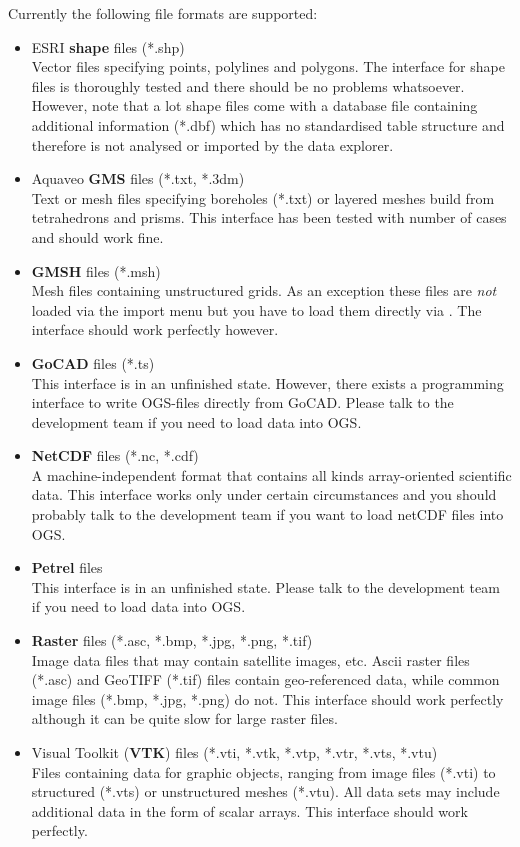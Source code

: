 Currently the following file formats are supported:
\begin{itemize}
\item ESRI \textbf{shape} files (*.shp)\\
Vector files specifying points, polylines and polygons. The interface for shape files is thoroughly tested and there should be no problems whatsoever. However, note that a lot shape files come with a database file containing additional information (*.dbf) which has no standardised table structure and therefore is not analysed or imported by the data explorer.
\item Aquaveo \textbf{GMS} files (*.txt, *.3dm)\\
Text or mesh files specifying boreholes (*.txt) or layered meshes build from tetrahedrons and prisms. This interface has been tested with number of cases and should work fine.
\item \textbf{GMSH} files (*.msh)\\
Mesh files containing unstructured grids. As an exception these files are \emph{not} loaded via the import menu but you have to load them directly via . The interface should work perfectly however.
\item \textbf{GoCAD} files (*.ts)\\
This interface is in an unfinished state. However, there exists a programming interface to write OGS-files directly from GoCAD. Please talk to the development team if you need to load data into OGS.
\item \textbf{NetCDF} files (*.nc, *.cdf)\\
A machine-independent format that contains all kinds array-oriented scientific data. This interface works only under certain circumstances and you should probably talk to the development team if you want to load netCDF files into OGS.
\item \textbf{Petrel} files\\
This interface is in an unfinished state. Please talk to the development team if you need to load data into OGS.
\item \textbf{Raster} files (*.asc, *.bmp, *.jpg, *.png, *.tif)\\
Image data files that may contain satellite images, etc. Ascii raster files (*.asc) and GeoTIFF (*.tif) files contain geo-referenced data, while common image files (*.bmp, *.jpg, *.png) do not. This interface should work perfectly although it can be quite slow for large raster files.
\item Visual Toolkit (\textbf{VTK}) files (*.vti, *.vtk, *.vtp, *.vtr, *.vts, *.vtu)\\
Files containing data for graphic objects, ranging from image files (*.vti) to structured (*.vts) or unstructured meshes (*.vtu). All data sets may include additional data in the form of scalar arrays. This interface should work perfectly.
\end{itemize}


